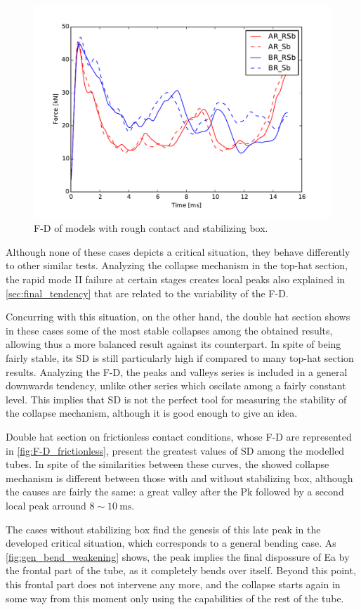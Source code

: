 \documentclass[
documentsize = a4, %
font = cmr, %
typesize = 11, %
printmode = true,
onehalfspacing = true,
language = en, %
titlepage = udciccp, %
degree = pt, %
dedication = true,
acknowledgements = true,
abstract-en = true,
abstract-es = false,
abstract-ga = false,
epigraphs = true,
toc = true,
lof = true,
lot = true,
frontmatterintoc = false,
notation = false,
minimal = false,
]{UDCthesis}
\begin{document}
\begin{figure}
	\centering
	\includegraphics[width=0.7\linewidth]{IMG_CUTRES/R_Sb}
	\caption{\Acrlong{F-D} of models with rough contact and stabilizing box.}
	\label{fig:R_Sb}
\end{figure}

Although none of these cases depicts a critical situation, they behave differently to other similar tests. Analyzing the collapse mechanism in the top-hat section, the rapid mode II failure at certain stages creates local peaks also explained in \cref{sec:final_tendency} that are related to the variability of the \gls{F-D}.

Concurring with this situation, on the other hand, the double hat section shows in these cases some of the most stable collapses among the obtained results, allowing thus a more balanced result against its counterpart. In spite of being fairly stable, its \gls{SD} is still particularly high if compared to many top-hat section results. Analyzing the \gls{F-D}, the peaks and valleys series is included in a general downwards tendency, unlike other series which oscilate among a fairly constant level. This implies that \gls{SD} is not the perfect tool for measuring the stability of the collapse mechanism, although it is good enough to give an idea.

Double hat section on frictionless contact conditions, whose \gls{F-D} are represented in \cref{fig:F-D_frictionless}, present the greatest values of \gls{SD} among the modelled tubes. In spite of the similarities between these curves, the showed collapse mechanism is different between those with and without stabilizing box, although the causes are fairly the same: a great valley after the \acrlong{Pk} followed by a second local peak arround $\num{8}\sim\SI{10}{\ms}$.

The cases without stabilizing box find the genesis of this late peak in the developed critical situation, which corresponds to a general bending case. As \cref{fig:gen_bend_weakening} shows, the peak implies the final dispossure of \gls{Ea} by the frontal part of the tube, as it completely bends over itself. Beyond this point, this frontal part does not intervene any more, and the collapse starts again in some way from this moment only using the capabilities of the rest of the tube.
\end{document}
